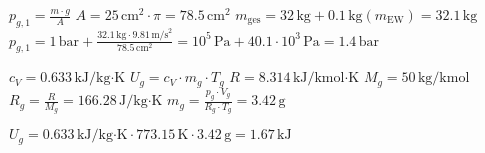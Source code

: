 \( p_{g,1} = \frac{m \cdot g}{A} \)  
\( A = 25 \, \text{cm}^2 \cdot \pi = 78.5 \, \text{cm}^2 \)  
\( m_{\text{ges}} = 32 \, \text{kg} + 0.1 \, \text{kg} (m_{\text{EW}}) = 32.1 \, \text{kg} \)  
\( p_{g,1} = 1 \, \text{bar} + \frac{32.1 \, \text{kg} \cdot 9.81 \, \text{m/s}^2}{78.5 \, \text{cm}^2} = 10^5 \, \text{Pa} + 40.1 \cdot 10^3 \, \text{Pa} = 1.4 \, \text{bar} \)  

\( c_V = 0.633 \, \text{kJ/kg·K} \)  
\( U_g = c_V \cdot m_g \cdot T_g \)  
\( R = 8.314 \, \text{kJ/kmol·K} \)  
\( M_g = 50 \, \text{kg/kmol} \)  
\( R_g = \frac{R}{M_g} = 166.28 \, \text{J/kg·K} \)  
\( m_g = \frac{p_g \cdot V_g}{R_g \cdot T_g} = 3.42 \, \text{g} \)  

\( U_g = 0.633 \, \text{kJ/kg·K} \cdot 773.15 \, \text{K} \cdot 3.42 \, \text{g} = 1.67 \, \text{kJ} \)